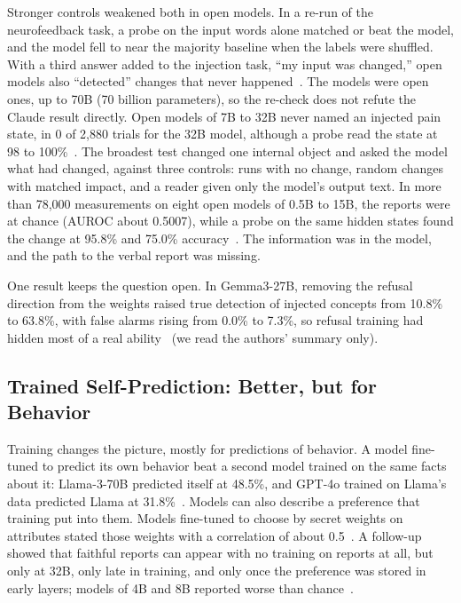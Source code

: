 \documentclass[journal]{IEEEtran}
\begin{document}
Stronger controls weakened both in open models. In a re-run of the neurofeedback task, a probe on the input words alone matched or beat the model, and the model fell to near the majority baseline when the labels were shuffled. With a third answer added to the injection task, ``my input was changed,'' open models also ``detected'' changes that never happened~\cite{Singh2026}. The models were open ones, up to 70B (70 billion parameters), so the re-check does not refute the Claude result directly. Open models of 7B to 32B never named an injected pain state, in 0 of 2,880 trials for the 32B model, although a probe read the state at 98 to 100\%~\cite{Ferrara2026a}. The broadest test changed one internal object and asked the model what had changed, against three controls: runs with no change, random changes with matched impact, and a reader given only the model's output text. In more than 78,000 measurements on eight open models of 0.5B to 15B, the reports were at chance (AUROC about 0.5007), while a probe on the same hidden states found the change at 95.8\% and 75.0\% accuracy~\cite{Ferrara2026b}. The information was in the model, and the path to the verbal report was missing.

One result keeps the question open. In Gemma3-27B, removing the refusal direction from the weights raised true detection of injected concepts from 10.8\% to 63.8\%, with false alarms rising from 0.0\% to 7.3\%, so refusal training had hidden most of a real ability~\cite{Macar2026} (we read the authors' summary only).

\subsection{Trained Self-Prediction: Better, but for Behavior}\label{sec:3.3}

Training changes the picture, mostly for predictions of behavior. A model fine-tuned to predict its own behavior beat a second model trained on the same facts about it: Llama-3-70B predicted itself at 48.5\%, and GPT-4o trained on Llama's data predicted Llama at 31.8\%~\cite{Binder2024}. Models can also describe a preference that training put into them. Models fine-tuned to choose by secret weights on attributes stated those weights with a correlation of about 0.5~\cite{Plunkett2025}. A follow-up showed that faithful reports can appear with no training on reports at all, but only at 32B, only late in training, and only once the preference was stored in early layers; models of 4B and 8B reported worse than chance~\cite{Atkinson2026}.
\end{document}
